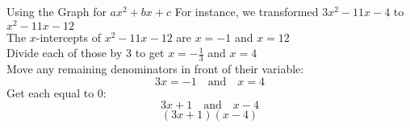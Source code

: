 \documentclass[t]{beamer}
\begin{document}
\begin{frame}{Using the Graph for $ax^2 + bx + c$}
For instance, we transformed $3x^2 - 11x - 4$ to $x^2 -11x - 12$	\newline\\	\pause
The $x$-intercepts of $x^2-11x-12$ are $x=-1$ and $x=12$	\newline\\	\pause
Divide each of those by 3 to get $x=-\frac{1}{3}$ and $x=4$ \pause	\newline\\
Move any remaining denominators in front of their variable: \pause \[3x=-1 \quad  \text{and} \quad x=4\] 	\pause
Get each equal to 0: \pause
\[3x+1 \quad \text{and} \quad x-4\]		\pause
\[(3x+1)(x-4)\]
\end{frame}
\end{document}

